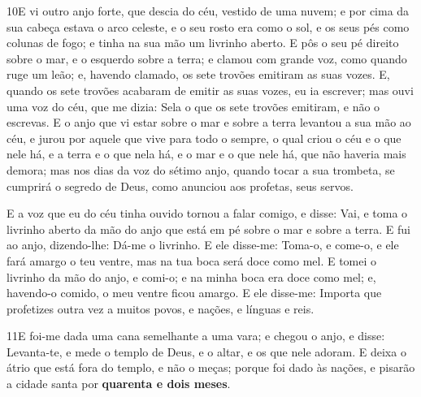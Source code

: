 \medskip

\lettrine{10} E vi outro anjo forte, que descia do céu,
vestido de uma nuvem; e por cima da sua cabeça estava o arco
celeste, e o seu rosto era como o sol, e os seus pés como colunas de
fogo; e tinha na sua mão um livrinho aberto. E pôs o seu pé
direito sobre o mar, e o esquerdo sobre a terra; e clamou com
grande voz, como quando ruge um leão; e, havendo clamado, os sete
trovões emitiram as suas vozes. E, quando os sete trovões
acabaram de emitir as suas vozes, eu ia escrever; mas ouvi uma voz
do céu, que me dizia: Sela o que os sete trovões emitiram, e não o
escrevas. E o anjo que vi estar sobre o mar e sobre a terra
levantou a sua mão ao céu, e jurou por aquele que vive para todo
o sempre, o qual criou o céu e o que nele há, e a terra e o que nela
há, e o mar e o que nele há, que não haveria mais demora; mas
nos dias da voz do sétimo anjo, quando tocar a sua trombeta, se
cumprirá o segredo de Deus, como anunciou aos profetas, seus servos.

E a voz que eu do céu tinha ouvido tornou a falar comigo, e disse:
Vai, e toma o livrinho aberto da mão do anjo que está em pé sobre o
mar e sobre a terra. E fui ao anjo, dizendo-lhe: Dá-me o
livrinho. E ele disse-me: Toma-o, e come-o, e ele fará amargo o teu
ventre, mas na tua boca será doce como mel. E tomei o
livrinho da mão do anjo, e comi-o; e na minha boca era doce como
mel; e, havendo-o comido, o meu ventre ficou amargo. E ele
disse-me: Importa que profetizes outra vez a muitos povos, e nações,
e línguas e reis.

\medskip

\lettrine{11} E foi-me dada uma cana semelhante a uma vara; e
chegou o anjo, e disse: Levanta-te, e mede o templo de Deus, e o
altar, e os que nele adoram. E deixa o átrio que está fora do
templo, e não o meças; porque foi dado às nações, e pisarão a cidade
santa por \textbf{quarenta e dois meses}.

